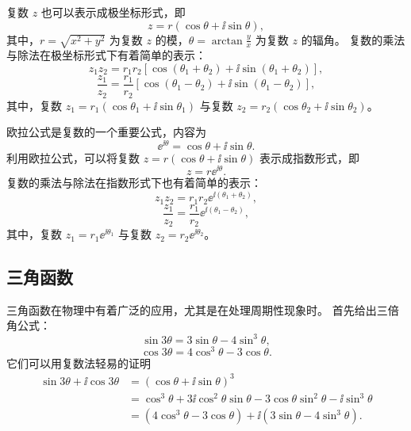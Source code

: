 复数 $ z $ 也可以表示成极坐标形式，即
\begin{equation}
    z = r (\cos \theta + \ii \sin \theta) ,
\end{equation}
其中，$ r = \sqrt{x^2 + y^2} $ 为复数 $ z $ 的模，$ \theta = \arctan \frac{y}{x} $ 为复数 $ z $ 的辐角。
复数的乘法与除法在极坐标形式下有着简单的表示：
\begin{equation}
    z_1 z_2 = r_1 r_2 [\cos (\theta_1 + \theta_2) + \ii \sin (\theta_1 + \theta_2)] ,
\end{equation}
\begin{equation}
    \frac{z_1}{z_2} = \frac{r_1}{r_2} [\cos (\theta_1 - \theta_2) + \ii \sin (\theta_1 - \theta_2)] ,
\end{equation}
其中，复数 $ z_1 = r_1 (\cos \theta_1 + \ii \sin \theta_1) $ 与复数 $ z_2 = r_2 (\cos \theta_2 + \ii \sin \theta_2) $。

欧拉公式是复数的一个重要公式，内容为
\begin{equation}
    \ee^{\ii \theta} = \cos \theta + \ii \sin \theta .
\end{equation}
利用欧拉公式，可以将复数 $ z = r (\cos \theta + \ii \sin \theta) $ 表示成指数形式，即
\begin{equation}
    z = r \ee^{\ii \theta} .
\end{equation}
复数的乘法与除法在指数形式下也有着简单的表示：
\begin{equation}
    z_1 z_2 = r_1 r_2 \ee^{\ii (\theta_1 + \theta_2)} ,
\end{equation}
\begin{equation}
    \frac{z_1}{z_2} = \frac{r_1}{r_2} \ee^{\ii (\theta_1 - \theta_2)} ,
\end{equation}
其中，复数 $ z_1 = r_1 \ee^{\ii \theta_1} $ 与复数 $ z_2 = r_2 \ee^{\ii\theta_2} $。



\subsection{三角函数}\label{subsec:trigonometric-functions}
三角函数在物理中有着广泛的应用，尤其是在处理周期性现象时。
首先给出三倍角公式：
\begin{equation}
    \sin 3\theta = 3 \sin \theta - 4 \sin^3 \theta ,
\end{equation}
\begin{equation}
    \cos 3\theta = 4 \cos^3 \theta - 3 \cos \theta .
\end{equation}
它们可以用复数法轻易的证明
\begin{equation}
    \begin{aligned}
        \sin 3\theta + \ii \cos 3\theta & = (\cos \theta + \ii \sin \theta)^3                                                                 \\
                                        & = \cos^3 \theta + 3 \ii \cos^2 \theta \sin \theta - 3 \cos \theta \sin^2 \theta - \ii \sin^3 \theta \\
                                        & = (4 \cos^3 \theta - 3 \cos \theta) + \ii (3 \sin \theta - 4 \sin^3 \theta) .
    \end{aligned}
\end{equation}

